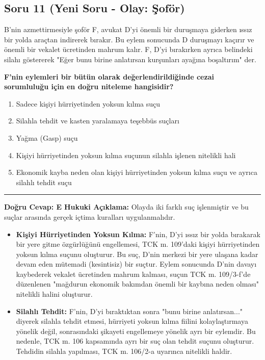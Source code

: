 \documentclass[a4paper, 11pt, twocolumn]{article}
\begin{document}
\newpage

\subsection*{Soru 11 (Yeni Soru - Olay: Şoför)}
B'nin azmettirmesiyle şoför F, avukat D'yi önemli bir duruşmaya giderken ıssız bir yolda araçtan indirerek bırakır. Bu eylem sonucunda D duruşmayı kaçırır ve önemli bir vekalet ücretinden mahrum kalır. F, D'yi bırakırken ayrıca belindeki silahı göstererek "Eğer bunu birine anlatırsan kurşunları ayağına boşaltırım" der.

\textbf{F'nin eylemleri bir bütün olarak değerlendirildiğinde cezai sorumluluğu için en doğru niteleme hangisidir?}
\begin{enumerate}[label=\Alph*)]
    \item Sadece kişiyi hürriyetinden yoksun kılma suçu
    \item Silahla tehdit ve kasten yaralamaya teşebbüs suçları
    \item Yağma (Gasp) suçu
    \item Kişiyi hürriyetinden yoksun kılma suçunun silahla işlenen nitelikli hali
    \item Ekonomik kayba neden olan kişiyi hürriyetinden yoksun kılma suçu ve ayrıca silahlı tehdit suçu
\end{enumerate}
\vspace{0.5cm}
\hrule
\vspace{0.5cm}
\textbf{Doğru Cevap: E}
\newline
\textbf{Hukuki Açıklama:} Olayda iki farklı suç işlenmiştir ve bu suçlar arasında gerçek içtima kuralları uygulanmalıdır.
\begin{itemize}
    \item \textbf{Kişiyi Hürriyetinden Yoksun Kılma:} F'nin, D'yi ıssız bir yolda bırakarak bir yere gitme özgürlüğünü engellemesi, TCK m. 109'daki kişiyi hürriyetinden yoksun kılma suçunu oluşturur. Bu suç, D'nin merkezi bir yere ulaşana kadar devam eden mütemadi (kesintisiz) bir suçtur. Eylem sonucunda D'nin davayı kaybederek vekalet ücretinden mahrum kalması, suçun TCK m. 109/3-f'de düzenlenen "mağdurun ekonomik bakımdan önemli bir kaybına neden olması" nitelikli halini oluşturur.
    \item \textbf{Silahlı Tehdit:} F'nin, D'yi bıraktıktan sonra "bunu birine anlatırsan..." diyerek silahla tehdit etmesi, hürriyeti yoksun kılma fiilini kolaylaştırmaya yönelik değil, sonrasındaki şikayeti engellemeye yönelik ayrı bir eylemdir. Bu nedenle, TCK m. 106 kapsamında ayrı bir suç olan tehdit suçunu oluşturur. Tehdidin silahla yapılması, TCK m. 106/2-a uyarınca nitelikli haldir.
\end{itemize}
\end{document}
